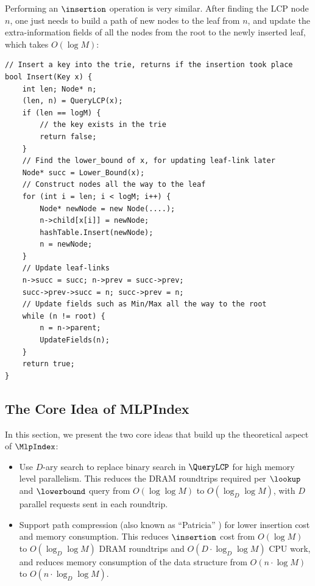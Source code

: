 \documentclass[11pt, usletter]{article}
\begin{document}
Performing an $\insertion$ operation is very similar. 
After finding the LCP node $n$, one just needs to build a path of new nodes to the leaf from $n$, 
and update the extra-information fields of all the nodes from the root to the newly inserted leaf,
which takes $O(\log M)$:

\singlespacing\begin{codebox}
\begin{verbatim}
// Insert a key into the trie, returns if the insertion took place
bool Insert(Key x) {
    int len; Node* n;
    (len, n) = QueryLCP(x);
    if (len == logM) {
        // the key exists in the trie
        return false;
    }
    // Find the lower_bound of x, for updating leaf-link later
    Node* succ = Lower_Bound(x);
    // Construct nodes all the way to the leaf
    for (int i = len; i < logM; i++) {
        Node* newNode = new Node(....);
        n->child[x[i]] = newNode;
        hashTable.Insert(newNode);
        n = newNode;
    }
    // Update leaf-links
    n->succ = succ; n->prev = succ->prev;
    succ->prev->succ = n; succ->prev = n;
    // Update fields such as Min/Max all the way to the root
    while (n != root) {
        n = n->parent;
        UpdateFields(n);
    }
    return true;
}
\end{verbatim}
\end{codebox}\doublespacing

\subsection{The Core Idea of MLPIndex} \label{mlpindex_simple}

In this section, we present the two core ideas that build up the theoretical aspect of $\MlpIndex$:
\begin{itemize}
[topsep=0pt,partopsep=0pt,itemsep=0pt,parsep=0pt,fullwidth,itemindent=\parindent,listparindent=\parindent]
\item Use $D$-ary search to replace binary search in $\QueryLCP$ for high memory level parallelism.
This reduces the DRAM roundtrips required per $\lookup$ and $\lowerbound$ query from $O(\log\log M)$ to $O(\log_D\log M)$, 
with $D$ parallel requests sent in each roundtrip.
\item Support path compression (also known as ``Patricia'' \cite{patricia}) for lower insertion cost and memory consumption. 
This reduces $\insertion$ cost from $O(\log M)$ to $O(\log_D\log M)$ DRAM roundtrips and $O(D\cdot \log_D\log M)$ CPU work, 
and reduces memory consumption of the data structure from $O(n\cdot\log M)$ to $O(n\cdot\log_D\log M)$.
\end{itemize}
\end{document}
